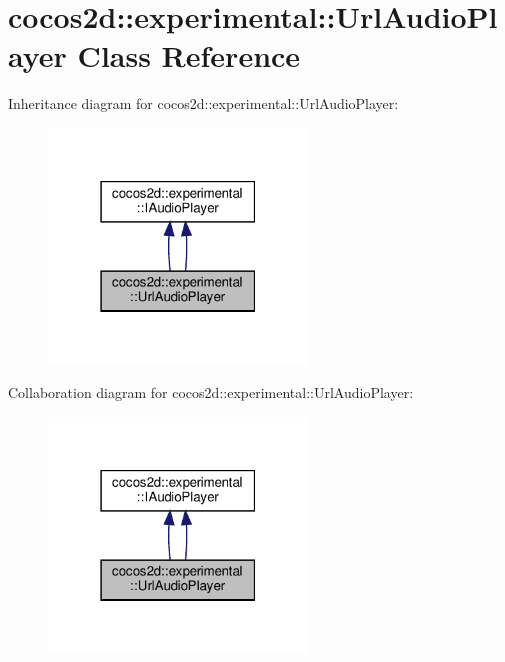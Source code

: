 \hypertarget{classcocos2d_1_1experimental_1_1UrlAudioPlayer}{}\section{cocos2d\+:\+:experimental\+:\+:Url\+Audio\+Player Class Reference}
\label{classcocos2d_1_1experimental_1_1UrlAudioPlayer}


Inheritance diagram for cocos2d\+:\+:experimental\+:\+:Url\+Audio\+Player\+:
\nopagebreak
\begin{figure}[H]
\begin{center}
\leavevmode
\includegraphics[width=195pt]{classcocos2d_1_1experimental_1_1UrlAudioPlayer__inherit__graph}
\end{center}
\end{figure}


Collaboration diagram for cocos2d\+:\+:experimental\+:\+:Url\+Audio\+Player\+:
\nopagebreak
\begin{figure}[H]
\begin{center}
\leavevmode
\includegraphics[width=195pt]{classcocos2d_1_1experimental_1_1UrlAudioPlayer__coll__graph}
\end{center}
\end{figure}
